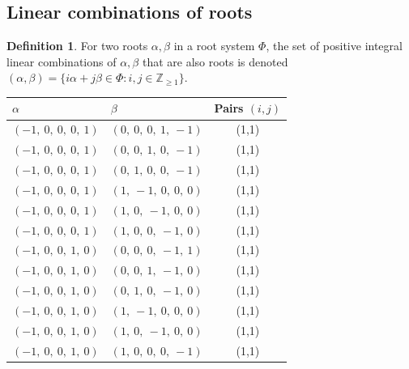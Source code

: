 \documentclass[11pt]{article}
\newcommand{\noi}{\noindent}
\theoremstyle{definition}
\newtheorem{definition}{Definition}[section]
\newif\ifsummablepairs
\begin{document}
\ifsummablepairs
\subsection{Linear combinations of roots}

\begin{definition}
For two roots $\alpha, \beta$ in a root system $\Phi$, the set of positive integral linear combinations of $\alpha, \beta$ that are also roots is denoted
\(
	(\alpha, \beta) = \{ i \alpha + j \beta \in \Phi : i, j \in \mathbb{Z}_{\ge 1} \}
\).
\end{definition}
\noi \noindent \begin{longtable}{|l|l|c|}
    \hline
    $\alpha$ & $\beta$ & Pairs $(i,j)$ \\
    \hline
    \endhead
    $\left( -1, \  0, \  0, \  0, \  1\right)$ & $\left( 0, \  0, \  0, \  1, \  -1\right)$ & (1,1) \\
    \hline
    $\left( -1, \  0, \  0, \  0, \  1\right)$ & $\left( 0, \  0, \  1, \  0, \  -1\right)$ & (1,1) \\
    \hline
    $\left( -1, \  0, \  0, \  0, \  1\right)$ & $\left( 0, \  1, \  0, \  0, \  -1\right)$ & (1,1) \\
    \hline
    $\left( -1, \  0, \  0, \  0, \  1\right)$ & $\left( 1, \  -1, \  0, \  0, \  0\right)$ & (1,1) \\
    \hline
    $\left( -1, \  0, \  0, \  0, \  1\right)$ & $\left( 1, \  0, \  -1, \  0, \  0\right)$ & (1,1) \\
    \hline
    $\left( -1, \  0, \  0, \  0, \  1\right)$ & $\left( 1, \  0, \  0, \  -1, \  0\right)$ & (1,1) \\
    \hline
    $\left( -1, \  0, \  0, \  1, \  0\right)$ & $\left( 0, \  0, \  0, \  -1, \  1\right)$ & (1,1) \\
    \hline
    $\left( -1, \  0, \  0, \  1, \  0\right)$ & $\left( 0, \  0, \  1, \  -1, \  0\right)$ & (1,1) \\
    \hline
    $\left( -1, \  0, \  0, \  1, \  0\right)$ & $\left( 0, \  1, \  0, \  -1, \  0\right)$ & (1,1) \\
    \hline
    $\left( -1, \  0, \  0, \  1, \  0\right)$ & $\left( 1, \  -1, \  0, \  0, \  0\right)$ & (1,1) \\
    \hline
    $\left( -1, \  0, \  0, \  1, \  0\right)$ & $\left( 1, \  0, \  -1, \  0, \  0\right)$ & (1,1) \\
    \hline
    $\left( -1, \  0, \  0, \  1, \  0\right)$ & $\left( 1, \  0, \  0, \  0, \  -1\right)$ & (1,1) \\

\end{longtable}
\end{document}

